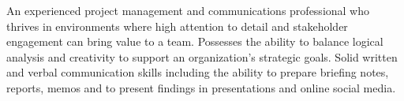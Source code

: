 

\begin{cvparagraph}

An experienced project management and communications professional who thrives in environments where high attention to detail and stakeholder engagement can bring value to a team. Possesses the ability to balance logical analysis and creativity to support an organization's strategic goals. Solid written and verbal communication skills including the ability to prepare briefing notes, reports, memos and to present findings in presentations and online social media. 
\end{cvparagraph}
